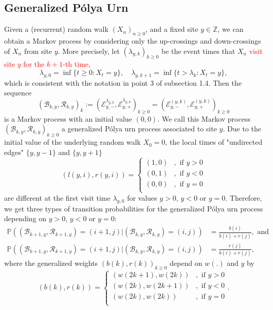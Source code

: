 \documentclass[twoside,12pt,a4paper]{article}
\numberwithin{equation}{section}
\newcommand{\edt}[1]{\textcolor{red}{#1}} %
\begin{document}
	\subsection{Generalized P\'{o}lya  Urn}
	Given a (recurrent) random walk $(X_n)_{n\geq 0}$, and a fixed site $y\in \mathbb{Z}$, we can obtain a Markov process by considering only the up-crossings and down-crossings of $X_n$ from site $y$. More precisely, let $(\lambda_{y,k})_{k\geq 0}$ be the event times that $X_n$ \edt{visit site $y$ for the $k+1$-th time,}
	$$
	 \lambda_{y,0} =\inf\{ t\geq 0: X_t = y \} , \quad \lambda_{y,k+1} = \inf\{ t> \lambda_{k}: X_t = y \},
	$$ 
	which is consistent with the notation in point 3 of subsection 1.4. 
	Then the sequence 
	$$
	(\mathcal{B}_{k,y},\mathcal{R}_{k,y} )_k:=\left(\mathcal{E}^{\lambda_{y,k}}_{y,-}, \mathcal{E}^{\lambda_{y,k}}_{y,+}\right)_{k\geq 0} =  \left(\mathcal{E}^{(y,k)}_{y,-}, \mathcal{E}^{(y,k)}_{y,+}\right)_{k\geq 0}
	$$ is a Markov process with an initial value $(0,0)$. We call this Markov process $(\mathcal{B}_{k,y},\mathcal{R}_{k,y} )_{k\geq 0}$ a generalized P\'{o}lya urn process associated to site $y$. Due to the initial value of the underlying random walk $X_0=0$, the local times of "undirected edges" $\{y,y-1\}$ and $\{y,y+1\}$ 
	$$\left(l(y,i),  r(y,i)\right) =  \begin{cases}	
		(1, 0) &,  \text{ if }  y>0 \\
		(0, 1) &,  \text{ if }  y<0 \\  
		(0, 0) &,  \text{ if }  y=0 \\ 
	\end{cases}$$ 
	are different at the first visit time $\lambda_{y,0}$ for values $y>0$, $y<0$ or $y=0$. Therefore, we get three types of transition probabilities
	for the generalized P\'{o}lya urn process depending on $y>0$, $y<0$ or $y=0$:
	\begin{align*}\label{eq: transition prob for GPU}
		\mathbb{P} \left((\mathcal{B}_{k+1,y},\mathcal{R}_{k+1,y})=  (i+1,j) \vert (\mathcal{B}_{k,y},\mathcal{R}_{k,y}) =(i,j)  \right) &= \frac{b(i)}{b(i)+r(j)}, \mbox{ and}  \\
		\mathbb{P} \left((\mathcal{B}_{k+1,y},\mathcal{R}_{k+1,y})=  (i+1,j) \vert (\mathcal{B}_{k,y},\mathcal{R}_{k,y}) =(i,j)  \right) &= \frac{r(j)}{b(i)+r(j)},
	\end{align*} where the generalized weights $(b(k),r(k))_{k\geq 0}$ depend on $w(.)$ and $y$ by  
	\begin{equation}\label{eq: generalized weights}
		(b(k), r(k)) = \begin{cases}
			(w(2k+1), w(2k)) &,  \text{ if }  y>0 \\
			(w(2k), w(2k+1)) &,  \text{ if }  y<0 \\  
			(w(2k), w(2k)) &,  \text{ if }  y=0 \\ 
		\end{cases}.
	\end{equation}
\end{document}
